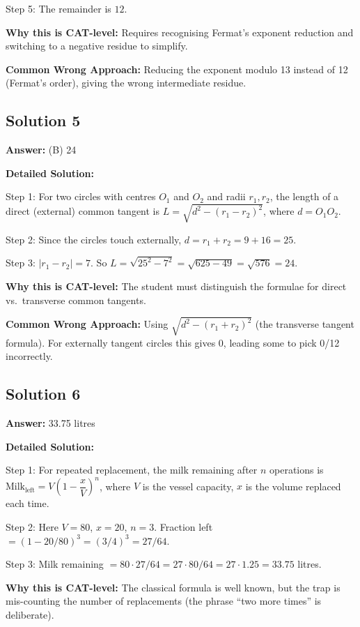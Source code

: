 \documentclass[11pt]{article}
\begin{document}
Step 5: The remainder is \(\boxed{12}\).

\textbf{Why this is CAT-level:} Requires recognising Fermat's exponent reduction and switching to a negative residue to simplify.

\textbf{Common Wrong Approach:} Reducing the exponent modulo 13 instead of 12 (Fermat's order), giving the wrong intermediate residue.

\subsection*{Solution 5}
\textbf{Answer:} (B) 24

\textbf{Detailed Solution:}

Step 1: For two circles with centres \(O_1\) and \(O_2\) and radii \(r_1, r_2\), the length of a direct (external) common tangent is
\(L = \sqrt{d^{2} - (r_1 - r_2)^{2}}\),
where \(d = O_1O_2\).

Step 2: Since the circles touch externally, \(d = r_1 + r_2 = 9 + 16 = 25\).

Step 3: \(|r_1 - r_2| = 7\). So \(L = \sqrt{25^{2} - 7^{2}} = \sqrt{625 - 49} = \sqrt{576} = 24\).

\textbf{Why this is CAT-level:} The student must distinguish the formulae for direct vs.\ transverse common tangents.

\textbf{Common Wrong Approach:} Using \(\sqrt{d^{2} - (r_1+r_2)^{2}}\) (the transverse tangent formula). For externally tangent circles this gives 0, leading some to pick 0/12 incorrectly.

\subsection*{Solution 6}
\textbf{Answer:} 33.75 litres

\textbf{Detailed Solution:}

Step 1: For repeated replacement, the milk remaining after \(n\) operations is
\(\text{Milk}_{\text{left}} = V\left(1 - \dfrac{x}{V}\right)^{n}\),
where \(V\) is the vessel capacity, \(x\) is the volume replaced each time.

Step 2: Here \(V = 80\), \(x = 20\), \(n = 3\). Fraction left \(= (1 - 20/80)^{3} = (3/4)^{3} = 27/64\).

Step 3: Milk remaining \(= 80 \cdot 27/64 = 27 \cdot 80/64 = 27 \cdot 1.25 = 33.75\) litres.

\textbf{Why this is CAT-level:} The classical formula is well known, but the trap is mis-counting the number of replacements (the phrase ``two more times'' is deliberate).
\end{document}
